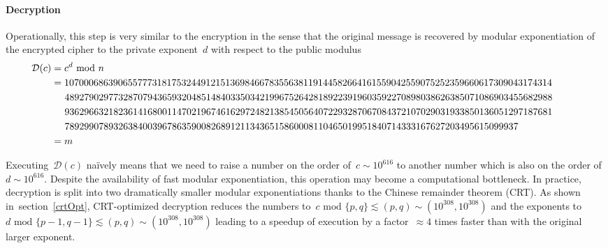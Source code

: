 \documentclass{article}
\begin{document}
\paragraph{Decryption}  Operationally, this step is very similar to the encryption in the sense that the original message is recovered by modular exponentiation of the encrypted cipher to the private exponent~$d$ with respect to the public modulus
\begin{align*}
\hspace*{-1cm} \mathcal{D}(c) &= c^d \,\,\text{mod}\,\,n  \\
\hspace*{-1cm}  &= 1070006863906557773181753244912151369846678355638119144582664161559042559075252359660617309043174314 \\
\hspace*{-1cm} & \hspace{0.48cm} 4892790297732870794365932048514840335034219967526428189223919603592270898038626385071086903455682988 \\
\hspace*{-1cm} & \hspace{0.48cm} 9362966321823614168001147021967461629724821385450564072293287067084372107029031933850136051297187681 \\
\hspace*{-1cm} & \hspace{0.48cm} 789299078932638400396786359008268912113436515860008110465019951840714333167627203495615099937 \\
\hspace*{-1cm} &= m
\end{align*}

\noindent Executing~$\mathcal{D}(c)$ na\"ively means that we need to raise a number on the order of~$c \sim 10^{616}$ to another number which is also on the order of~$d \sim 10^{616}$.  Despite the availability of fast modular exponentiation, this operation may become a computational bottleneck. In practice, decryption is split into two dramatically smaller modular exponentiations thanks to the Chinese remainder theorem (CRT).  As shown in~section~\ref{crtOpt}, CRT-optimized decryption reduces the numbers to~$c\,\,\text{mod}\,\,\{p, q\} \lesssim (p, q) \sim (10^{308}, 10^{308})$ and the exponents to~$d \,\,\text{mod}\,\,\{p-1, q-1\} \lesssim (p, q) \sim (10^{308}, 10^{308})$ leading to a speedup of execution by a factor~$\approx 4$ times faster than with the original larger exponent.
\end{document}
